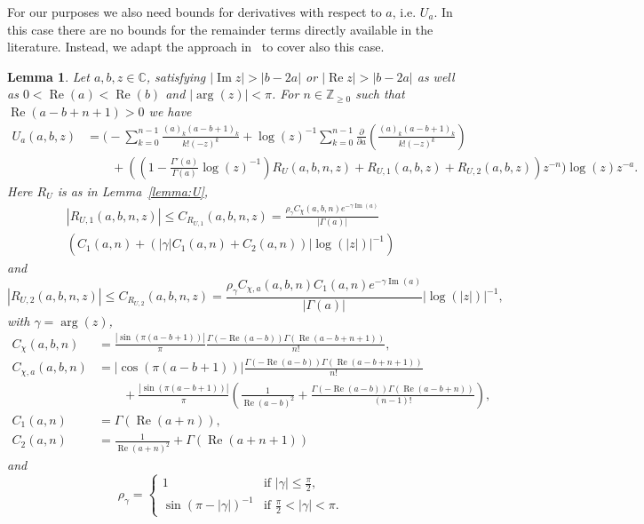 \documentclass[11pt]{article}
\DeclareMathOperator{\real}{Re}
\DeclareMathOperator{\imag}{Im}
\newtheorem{lemma}[definition]{Lemma}
\begin{document}
For our purposes we also need bounds for derivatives with respect to
\(a\), i.e. \(U_{a}\). In this case there are no bounds for the
remainder terms directly available in the literature. Instead, we
adapt the approach in~\cite{Olver1991b} to cover also this case.

\begin{lemma}
  \label{lemma:U-a}
  Let \(a, b, z \in \mathbb{C}\), satisfying \(|\imag z| > |b - 2a|\)
  or \(|\real z| > |b - 2a|\) as well as \(0 < \real(a) < \real(b)\)
  and \(|\arg(z)| < \pi\). For \(n \in \mathbb{Z}_{\geq 0}\) such that
  \(\real(a - b + n + 1) > 0\) we have
  \begin{align*}
    U_{a}(a, b, z)
    &= \Bigg(
      -\sum_{k = 0}^{n - 1}\frac{(a)_{k}(a - b + 1)_{k}}{k!(-z)^{k}}
      + \log(z)^{-1}\sum_{k = 0}^{n - 1}\frac{\partial}{\partial a}\left(
      \frac{(a)_{k}(a - b + 1)_{k}}{k!(-z)^{k}}
      \right)\\
    &\qquad+ \left(
      \left(1 - \frac{\Gamma'(a)}{\Gamma(a)}\log(z)^{-1}\right)R_{U}(a, b, n, z)
      + R_{U,1}(a, b, z) + R_{U,2}(a, b, z)
      \right)z^{-n}
      \Bigg)\log(z)z^{-a}.
  \end{align*}
  Here \(R_{U}\) is as in Lemma~\ref{lemma:U},
  \begin{multline*}
    \left|R_{U,1}\!\left(a,b,n,z\right)\right| \leq
    C_{R_{U,1}}(a, b, n, z) =
    \frac{\rho_{\gamma}C_{\chi}(a, b, n)e^{-\gamma\imag(a)}}{|\Gamma(a)|}\\
    \left(
      C_{1}(a, n) + (|\gamma|C_{1}(a, n) + C_{2}(a, n))|\log(|z|)|^{-1}
    \right)
  \end{multline*}
  and
  \begin{equation*}
    \left|R_{U,2}\!\left(a,b,n,z\right)\right| \leq
    C_{R_{U,2}}(a, b, n, z) =
    \frac{\rho_{\gamma}C_{\chi,a}(a, b, n)C_{1}(a, n)e^{-\gamma\imag(a)}}{|\Gamma(a)|}|\log(|z|)|^{-1},
  \end{equation*}
  with \(\gamma = \arg(z)\),
  \begin{align*}
    C_{\chi}(a, b, n)
    &= \frac{|\sin(\pi(a - b + 1))|}{\pi}
      \frac{\Gamma(-\real(a - b))\Gamma(\real(a - b + n + 1))}{n!},\\
    C_{\chi,a}(a, b, n)
    &= |\cos(\pi(a - b + 1))|
      \frac{\Gamma(-\real(a - b))\Gamma(\real(a - b + n + 1))}{n!}\\
    &\qquad+ \frac{|\sin(\pi(a - b + 1))|}{\pi}
      \left(
      \frac{1}{\real(a - b)^{2}}
      + \frac{\Gamma(-\real(a - b))\Gamma(\real(a - b + n))}{(n - 1)!}
      \right),\\
    C_{1}(a, n)
    &= \Gamma(\real(a + n)),\\
    C_{2}(a, n)
    &= \frac{1}{\real(a + n)^{2}} + \Gamma(\real(a + n + 1))
  \end{align*}
  and
  \begin{equation*}
    \rho_\gamma =
    \begin{cases}
      1 & \text{if } |\gamma| \leq \frac{\pi}{2}, \\
      \sin(\pi - |\gamma|)^{-1} & \text{if } \frac{\pi}{2} < |\gamma| < \pi.
    \end{cases}
  \end{equation*}


\end{lemma}
\end{document}
